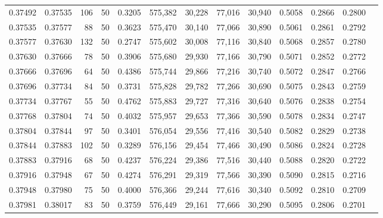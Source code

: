 \begin{tabular}{rrrrrrrrrrrrr}
0.37492 & 0.37535 &   106 &  50 &                                     0.3205 & 575,382 &  30,228 &  77,016 &  30,940 & 0.5058 & 0.2866 & 0.2800 \\
0.37535 & 0.37577 &    88 &  50 &                                     0.3623 & 575,470 &  30,140 &  77,066 &  30,890 & 0.5061 & 0.2861 & 0.2792 \\
0.37577 & 0.37630 &   132 &  50 &                                     0.2747 & 575,602 &  30,008 &  77,116 &  30,840 & 0.5068 & 0.2857 & 0.2780 \\
0.37630 & 0.37666 &    78 &  50 &                                     0.3906 & 575,680 &  29,930 &  77,166 &  30,790 & 0.5071 & 0.2852 & 0.2772 \\
0.37666 & 0.37696 &    64 &  50 &                                     0.4386 & 575,744 &  29,866 &  77,216 &  30,740 & 0.5072 & 0.2847 & 0.2766 \\
0.37696 & 0.37734 &    84 &  50 &                                     0.3731 & 575,828 &  29,782 &  77,266 &  30,690 & 0.5075 & 0.2843 & 0.2759 \\
0.37734 & 0.37767 &    55 &  50 &                                     0.4762 & 575,883 &  29,727 &  77,316 &  30,640 & 0.5076 & 0.2838 & 0.2754 \\
0.37768 & 0.37804 &    74 &  50 &                                     0.4032 & 575,957 &  29,653 &  77,366 &  30,590 & 0.5078 & 0.2834 & 0.2747 \\
0.37804 & 0.37844 &    97 &  50 &                                     0.3401 & 576,054 &  29,556 &  77,416 &  30,540 & 0.5082 & 0.2829 & 0.2738 \\
0.37844 & 0.37883 &   102 &  50 &                                     0.3289 & 576,156 &  29,454 &  77,466 &  30,490 & 0.5086 & 0.2824 & 0.2728 \\
0.37883 & 0.37916 &    68 &  50 &                                     0.4237 & 576,224 &  29,386 &  77,516 &  30,440 & 0.5088 & 0.2820 & 0.2722 \\
0.37916 & 0.37948 &    67 &  50 &                                     0.4274 & 576,291 &  29,319 &  77,566 &  30,390 & 0.5090 & 0.2815 & 0.2716 \\
0.37948 & 0.37980 &    75 &  50 &                                     0.4000 & 576,366 &  29,244 &  77,616 &  30,340 & 0.5092 & 0.2810 & 0.2709 \\
0.37981 & 0.38017 &    83 &  50 &                                     0.3759 & 576,449 &  29,161 &  77,666 &  30,290 & 0.5095 & 0.2806 & 0.2701 \\

\end{tabular}
